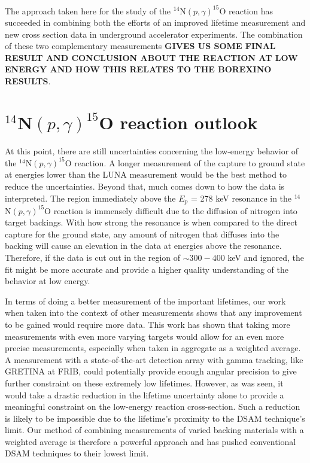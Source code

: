 The approach taken here for the study of the $^{14}$N$(p,\gamma)^{15}$O reaction has succeeded in combining both the efforts of an improved lifetime measurement and new cross section data in underground accelerator experiments. The combination of these two complementary measurements \textbf{GIVES US SOME FINAL RESULT AND CONCLUSION ABOUT THE REACTION AT LOW ENERGY AND HOW THIS RELATES TO THE BOREXINO RESULTS}.


\section{$^{14}$N$\left( p,\gamma \right) ^{15}$O reaction outlook}
\label{sec: outlook}

At this point, there are still uncertainties concerning the low-energy behavior of the $^{14}$N$\left( p,\gamma \right) ^{15}$O reaction. A longer measurement of the capture to ground state at energies lower than the LUNA measurement would be the best method to reduce the uncertainties. Beyond that, much comes down to how the data is interpreted. The region immediately above the $E_{p}$ = 278 keV resonance in the $^{14}$N$\left( p,\gamma \right) ^{15}$O reaction is immensely difficult due to the diffusion of nitrogen into target backings. With how strong the resonance is when compared to the direct capture for the ground state, any amount of nitrogen that diffuses into the backing will cause an elevation in the data at energies above the resonance. Therefore, if the data is cut out in the region of $\sim 300 - 400$ keV and ignored, the fit might be more accurate and provide a higher quality understanding of the behavior at low energy. 

In terms of doing a better measurement of the important lifetimes, our work when taken into the context of other measurements shows that any improvement to be gained would require more data. This work has shown that taking more measurements with even more varying targets would allow for an even more precise measurements, especially when taken in aggregate as a weighted average. A measurement with a state-of-the-art detection array with gamma tracking, like GRETINA at FRIB, could potentially provide enough angular precision to give further constraint on these extremely low lifetimes. However, as was seen, it would take a drastic reduction in the lifetime uncertainty alone to provide a meaningful constraint on the low-energy reaction cross-section. Such a reduction is likely to be impossible due to the lifetime's proximity to the DSAM technique's limit. Our method of combining measurements of varied backing materials with a weighted average is therefore a powerful approach and has pushed conventional DSAM techniques to their lowest limit. 



%
% 
% 
